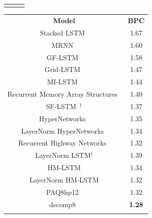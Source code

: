 \documentclass{article} %
\begin{document}
\begin{table}[t]
{\begin{minipage}{0.4\textwidth}
\begin{tabular}{c c c }
            \Xhline{0.8pt}
        \end{tabular}
    \end{minipage}
    \hfill
    \begin{minipage}{0.45\textwidth}
        \centering
        \begin{tabular}{c c }
            \Xhline{0.8pt}
            \multicolumn{2}{c}{\bf Hutter Prize Wikipedia}\\
            \hline
            {\bf Model} & {\bf BPC} \\
            \hline
            Stacked LSTM~\citep{graves2013generating}                    & 1.67 \\
            MRNN~\citep{sutskever2011generating}                         & 1.60 \\
            GF-LSTM~\citep{chung2015gated}                               & 1.58 \\
            Grid-LSTM~\citep{kalchbrenner2015grid}                       & 1.47 \\
            MI-LSTM~\citep{wu2016multiplicative}                         & 1.44 \\
            Recurrent Memory Array Structures~\citep{rocki2016recurrent} & 1.40 \\
            SF-LSTM~\citep{rocki2016surprisal}$^{\ddagger}$              & 1.37 \\
            HyperNetworks~\citep{ha2016hypernetworks}                    & 1.35 \\
            LayerNorm HyperNetworks~\citep{ha2016hypernetworks}          & 1.34 \\
            Recurrent Highway Networks~\citep{zilly2016recurrent}        & 1.32 \\
            \hline
            LayerNorm LSTM$^\dagger$                                     & 1.39 \\
            HM-LSTM                                                      & 1.34 \\
            LayerNorm HM-LSTM                                            & 1.32 \\
            \hline
            PAQ8hp12~\citep{mahoney2005adaptive}                         & 1.32 \\
            decomp8~\citep{mahoney2009large}                             & {\bf 1.28} \\
            \Xhline{0.8pt}
        \end{tabular}
    \end{minipage}
}
\end{table}
\end{document}
